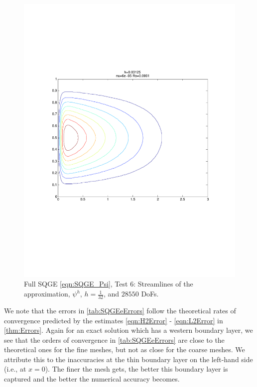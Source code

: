 \begin{figure}%
  \begin{center}
    \includegraphics[trim=0 200 20 215, clip=true, scale=0.5]{SQGEe.pdf}
    \caption{Full SQGE \eqref{eqn:SQGE_Psi}, Test 6: Streamlines of the approximation,
    $\psi^h$, $h=\frac{1}{32}$, and $28550$ DoFs.}
    \label{fig:SQGEe}
  \end{center}
\end{figure}

We note that the errors in \autoref{tab:SQGEeErrors} follow the theoretical rates of convergence
predicted by the estimates \eqref{eqn:H2Error} - \eqref{eqn:L2Error} in \autoref{thm:Errors}. Again
for an exact solution which has a western boundary layer, we see that the orders of convergence in \autoref{tab:SQGEeErrors} are close to the theoretical ones for the fine meshes, but
not as close for the coarse meshes. We attribute this to the inaccuracies at the thin boundary layer
on the left-hand side (i.e., at $x=0$). The finer the mesh gets, the better this boundary layer is
captured and the better the numerical accuracy becomes.
